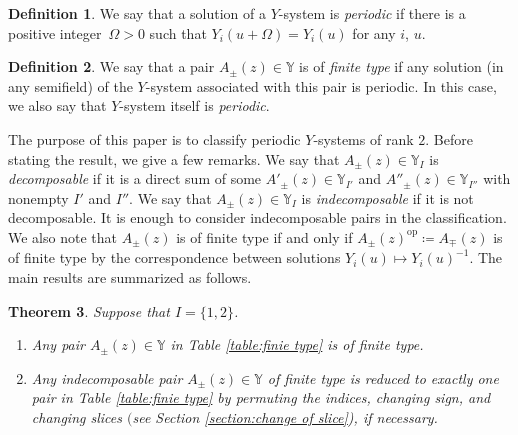 \documentclass[10pt,a4paper]{amsart}
\numberwithin{equation}{section}
\newtheorem{Theorem}{Theorem}[section]
\theoremstyle{definition}
\newtheorem{Definition}[Theorem]{Definition}
\begin{document}
\begin{Definition}\label{def:periodic}
 We say that a solution of a $Y$-system is \emph{periodic} if
 there is a positive integer~${\Omega > 0}$ such that $Y_i (u + \Omega) = Y_i (u)$
 for any $i$, $u$.
\end{Definition}

\begin{Definition}
 We say that a pair $A_\pm (z) \in \mathbb{Y}$ is of \emph{finite type} if
 any solution (in any semifield) of the $Y$-system associated with this pair is periodic.
 In this case, we also say that $Y$-system itself is \emph{periodic}.
\end{Definition}

The purpose of this paper is to classify periodic $Y$-systems of rank $2$.
Before stating the result, we give a few remarks.
We say that $A_\pm(z) \in \mathbb{Y}_I$ is \emph{decomposable} if
it is a direct sum of some $A'_\pm(z) \in \mathbb{Y}_{I'}$ and $A''_\pm(z) \in \mathbb{Y}_{I''}$
with nonempty $I'$ and $I''$.
We say that $A_\pm(z) \in \mathbb{Y}_I$ is \emph{indecomposable} if it is not decomposable.
It is enough to consider indecomposable pairs in the classification.
We also note that $A_\pm (z)$ is of finite type if and only if
$A_\pm(z)^{\mathrm{op}} \coloneqq A_\mp(z)$ is of finite type by the correspondence
between solutions $Y_i(u) \mapsto Y_i(u)^{-1}$.
The main results are summarized as follows.


\begin{Theorem}\label{theorem:main}
 Suppose that $I = \{1, 2\}$.
 \begin{enumerate}\itemsep=0pt
 \item[$(1)$] Any pair $A_\pm (z) \in \mathbb{Y}$ in Table {\rm\ref{table:finie type}} is of finite type.
 \item[$(2)$] Any indecomposable pair $A_\pm (z) \in \mathbb{Y}$ of finite type is reduced to exactly one pair in Table {\rm\ref{table:finie type}} by
 permuting the indices, changing sign, and changing slices $($see Section {\rm\ref{section:change of slice})}, if necessary.
 \end{enumerate}
\end{Theorem}
\end{document}
